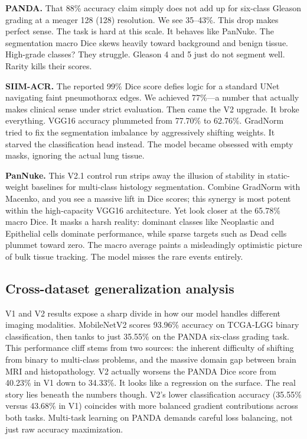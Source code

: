 \documentclass[conference,a4paper]{IEEEtran}
\begin{document}
\textbf{PANDA.} That 88\% accuracy claim simply does not add up for six-class Gleason grading at a meager 128\,\texttimes\,(128) resolution. We see 35--43\%. This drop makes perfect sense. The task is hard at this scale. It behaves like PanNuke. The segmentation macro Dice skews heavily toward background and benign tissue. High-grade classes? They struggle. Gleason 4 and 5 just do not segment well. Rarity kills their scores.

\textbf{SIIM-ACR.} The reported 99\% Dice score defies logic for a standard UNet navigating faint pneumothorax edges. We achieved 77\%—a number that actually makes clinical sense under strict evaluation. Then came the V2 upgrade. It broke everything. VGG16 accuracy plummeted from 77.70\% to 62.76\%. GradNorm tried to fix the segmentation imbalance by aggressively shifting weights. It starved the classification head instead. The model became obsessed with empty masks, ignoring the actual lung tissue.

\textbf{PanNuke.} This V2.1 control run strips away the illusion of stability in static-weight baselines for multi-class histology segmentation. Combine GradNorm with Macenko, and you see a massive lift in Dice scores; this synergy is most potent within the high-capacity VGG16 architecture. Yet look closer at the 65.78\% macro Dice. It masks a harsh reality: dominant classes like Neoplastic and Epithelial cells dominate performance, while sparse targets such as Dead cells plummet toward zero. The macro average paints a misleadingly optimistic picture of bulk tissue tracking. The model misses the rare events entirely.

\subsection{Cross-dataset generalization analysis}
V1 and V2 results expose a sharp divide in how our model handles different imaging modalities. MobileNetV2 scores 93.96\% accuracy on TCGA-LGG binary classification, then tanks to just 35.55\% on the PANDA six-class grading task. This performance cliff stems from two sources: the inherent difficulty of shifting from binary to multi-class problems, and the massive domain gap between brain MRI and histopathology. V2 actually worsens the PANDA Dice score from 40.23\% in V1 down to 34.33\%. It looks like a regression on the surface. The real story lies beneath the numbers though. V2’s lower classification accuracy (35.55\% versus 43.68\% in V1) coincides with more balanced gradient contributions across both tasks. Multi-task learning on PANDA demands careful loss balancing, not just raw accuracy maximization.
\end{document}

